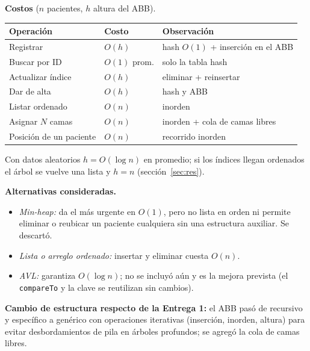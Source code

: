 \documentclass[11pt,a4paper]{article}
\begin{document}
\textbf{Costos} ($n$ pacientes, $h$ altura del ABB).
\begin{center}
\begin{tabular}{@{}lll@{}}
\toprule \textbf{Operación} & \textbf{Costo} & \textbf{Observación}\\ \midrule
Registrar & $O(h)$ & hash $O(1)$ + inserción en el ABB\\
Buscar por ID & $O(1)$ prom. & solo la tabla hash\\
Actualizar índice & $O(h)$ & eliminar + reinsertar\\
Dar de alta & $O(h)$ & hash y ABB\\
Listar ordenado & $O(n)$ & inorden\\
Asignar $N$ camas & $O(n)$ & inorden + cola de camas libres\\
Posición de un paciente & $O(n)$ & recorrido inorden\\
\bottomrule
\end{tabular}
\end{center}
Con datos aleatorios $h=O(\log n)$ en promedio; si los índices llegan ordenados el árbol se vuelve una lista y $h=n$ (sección~\ref{sec:res}).

\textbf{Alternativas consideradas.}
\begin{itemize}[nosep]
\item \emph{Min-heap:} da el más urgente en $O(1)$, pero no lista en orden ni permite eliminar o reubicar un paciente cualquiera sin una estructura auxiliar. Se descartó.
\item \emph{Lista o arreglo ordenado:} insertar y eliminar cuesta $O(n)$.
\item \emph{AVL:} garantiza $O(\log n)$; no se incluyó aún y es la mejora prevista (el \texttt{compareTo} y la clave se reutilizan sin cambios).
\end{itemize}
\textbf{Cambio de estructura respecto de la Entrega 1:} el ABB pasó de recursivo y específico a genérico con operaciones iterativas (inserción, inorden, altura) para evitar desbordamientos de pila en árboles profundos; se agregó la cola de camas libres.
\end{document}
